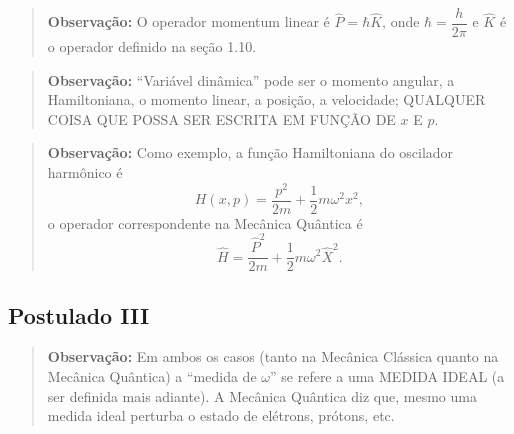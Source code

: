 \begin{quote}
\textbf{Observação:} O operador momentum linear é $\hat{P} = \hbar \hat{K}$, onde $\hbar = \dfrac{h}{2\pi}$ e $\hat{K}$ é o operador definido na seção 1.10.
\end{quote}

\begin{quote}
\textbf{Observação:} ``Variável dinâmica'' pode ser o momento angular, a Hamiltoniana, o momento linear, a posição, a velocidade; QUALQUER COISA QUE POSSA SER ESCRITA EM FUNÇÃO DE $x$ E $p$.
\end{quote}

\begin{quote}
\textbf{Observação:} Como exemplo, a função Hamiltoniana do oscilador harmônico é
\begin{equation}
H(x,p) = \frac{p^2}{2m} + \frac{1}{2}m\omega^2 x^2,
\end{equation}
o operador correspondente na Mecânica Quântica é
\begin{equation}
\hat{H} = \frac{\hat{P}^2}{2m} + \frac{1}{2}m\omega^2 \hat{X}^2.
\end{equation}
\end{quote}

\subsection*{Postulado III}


\begin{quote}
\textbf{Observação:} Em ambos os casos (tanto na Mecânica Clássica quanto na Mecânica Quântica) a ``medida de $\omega$'' se refere a uma MEDIDA IDEAL (a ser definida mais adiante). A Mecânica Quântica diz que, mesmo uma medida ideal perturba o estado de elétrons, prótons, etc.
\end{quote}

